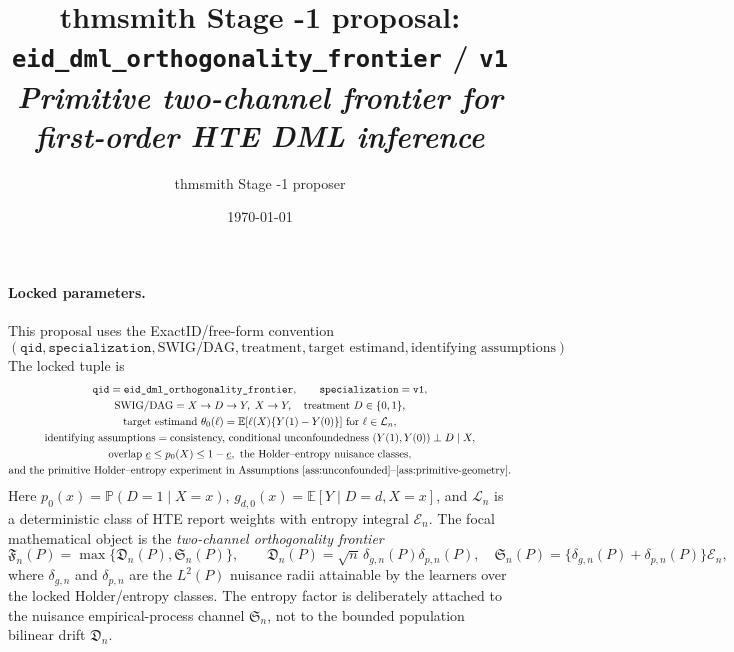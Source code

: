 \documentclass[11pt]{article}
\title{thmsmith Stage -1 proposal: \texttt{eid\_dml\_orthogonality\_frontier} / \texttt{v1}%
  \\ \large\textit{Primitive two-channel frontier for first-order HTE DML inference}}
\author{thmsmith Stage -1 proposer}
\date{\today}
\newcommand{\E}{\mathbb{E}}
\renewcommand{\Pr}{\mathbb{P}}
\theoremstyle{definition}
\theoremstyle{plain}
\theoremstyle{remark}
\begin{document}
\maketitle


\paragraph{Locked parameters.}
This proposal uses the ExactID/free-form convention
\[
(\texttt{qid},\texttt{specialization},\text{SWIG/DAG},\text{treatment},
\text{target estimand},\text{identifying assumptions}).
\]
The locked tuple is
\[
\begin{gathered}
\texttt{qid}=\texttt{eid\_dml\_orthogonality\_frontier},\qquad
\texttt{specialization}=\texttt{v1},\\
\text{SWIG/DAG}=X\to D\to Y,\; X\to Y,\quad
\text{treatment }D\in\{0,1\},\\
\text{target estimand } \theta_0(\ell)=\E[\ell(X)\{Y(1)-Y(0)\}]
\text{ for }\ell\in\mathcal{L}_n,\\
\text{identifying assumptions}=\text{consistency, conditional unconfoundedness }
(Y(1),Y(0))\perp D\mid X,\\
\text{overlap } \underline e\le p_0(X)\le 1-\underline e,\text{ the Holder--entropy nuisance classes,}\\
\text{and the primitive Holder--entropy experiment in Assumptions
\ref{ass:unconfounded}--\ref{ass:primitive-geometry}.}
\end{gathered}
\]
Here \(p_0(x)=\Pr(D=1\mid X=x)\), \(g_{d,0}(x)=\E[Y\mid D=d,X=x]\), and
\(\mathcal{L}_n\) is a deterministic class of HTE report weights with entropy
integral \(\mathcal{E}_n\).  The focal mathematical object is the
\emph{two-channel orthogonality frontier}
\[
\mathfrak{F}_n(P)=
\max\{\mathfrak{D}_n(P),\mathfrak{S}_n(P)\},\qquad
\mathfrak{D}_n(P)=\sqrt n\,\delta_{g,n}(P)\delta_{p,n}(P),\quad
\mathfrak{S}_n(P)=\{\delta_{g,n}(P)+\delta_{p,n}(P)\}\mathcal{E}_n,
\]
where \(\delta_{g,n}\) and \(\delta_{p,n}\) are the \(L^2(P)\) nuisance radii
attainable by the learners over the locked Holder/entropy classes.  The
entropy factor is deliberately attached to the nuisance empirical-process
channel \(\mathfrak{S}_n\), not to the bounded population bilinear drift
\(\mathfrak{D}_n\).
\end{document}
